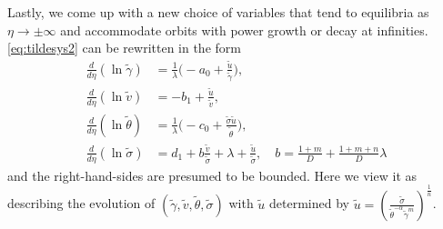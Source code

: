 \documentclass[a4paper,11pt]{article}
\def\tg{{\tilde{\gamma}}}
\def\tv{{\tilde{v}}}
\def\tth{{\tilde{\theta}}}
\def\ts{{\tilde{\sigma}}}
\def\tu{{\tilde{u}}}
\theoremstyle{remark}
\begin{document}
Lastly, we come up with a new choice of variables that tend to equilibria as $\eta \rightarrow \pm \infty$ and accommodate
orbits with power growth or decay at infinities. \eqref{eq:tildesys2} can be rewritten in the form
\begin{equation}
 \label{eq:tildesys3}
\begin{aligned}
\frac{d}{d\eta}{(\ln{\tg})}  &=  \tfrac{1}{\lambda} \big (- a_0 +  \frac{\tu}{\tg} \big ),
\\
\frac{d}{d\eta}{(\ln{\tv})}  &=  - b_1 + \frac{\tu}{\tv} ,
\\
\frac{d}{d\eta}{(\ln{\tth})} &=   \tfrac{1}{\lambda} \big (- c_0 +  \frac{\ts \tu}{\tth} \big ),
\\
\frac{d}{d\eta}{(\ln{\ts})} &= d_1 + b \frac{\tv}{\ts} + \lambda + \frac{\tu}{\ts}, \quad b = \frac{1+m}{D} + \frac{1+m+n}{D}\lambda
\end{aligned}
\end{equation}
and the right-hand-sides are presumed to be bounded. Here we view it as describing the evolution of $(\tg,\tv,\tth,\ts)$ with $\tu$ determined by $\tu = \left ( \frac{\ts}{ \tth^{-\alpha} \tg^m} \right )^\frac{1}{n}$.
\end{document}
